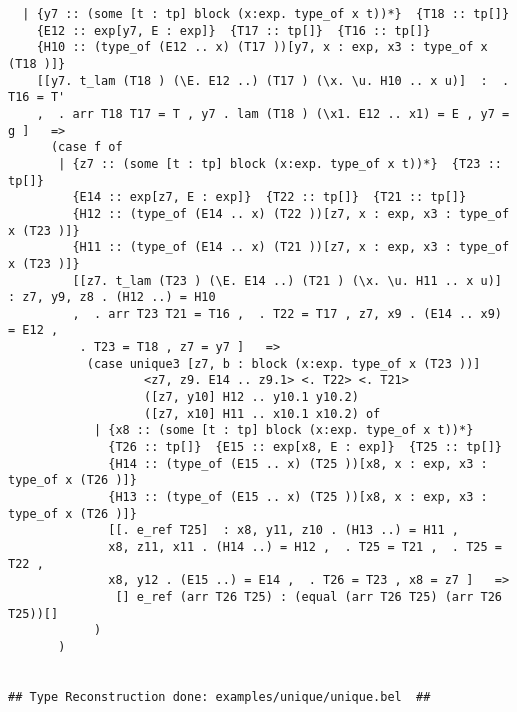 \documentclass[12pt]{article}
\begin{document}
\begin{verbatim}
  | {y7 :: (some [t : tp] block (x:exp. type_of x t))*}  {T18 :: tp[]} 
    {E12 :: exp[y7, E : exp]}  {T17 :: tp[]}  {T16 :: tp[]} 
    {H10 :: (type_of (E12 .. x) (T17 ))[y7, x : exp, x3 : type_of x (T18 )]}
    [[y7. t_lam (T18 ) (\E. E12 ..) (T17 ) (\x. \u. H10 .. x u)]  :  . T16 = T'
    ,  . arr T18 T17 = T , y7 . lam (T18 ) (\x1. E12 .. x1) = E , y7 = g ]   => 
      (case f of 
       | {z7 :: (some [t : tp] block (x:exp. type_of x t))*}  {T23 :: tp[]} 
         {E14 :: exp[z7, E : exp]}  {T22 :: tp[]}  {T21 :: tp[]} 
         {H12 :: (type_of (E14 .. x) (T22 ))[z7, x : exp, x3 : type_of x (T23 )]} 
         {H11 :: (type_of (E14 .. x) (T21 ))[z7, x : exp, x3 : type_of x (T23 )]}
         [[z7. t_lam (T23 ) (\E. E14 ..) (T21 ) (\x. \u. H11 .. x u)]  : z7, y9, z8 . (H12 ..) = H10
         ,  . arr T23 T21 = T16 ,  . T22 = T17 , z7, x9 . (E14 .. x9) = E12 ,
          . T23 = T18 , z7 = y7 ]   => 
           (case unique3 [z7, b : block (x:exp. type_of x (T23 ))]
                   <z7, z9. E14 .. z9.1> <. T22> <. T21>
                   ([z7, y10] H12 .. y10.1 y10.2)
                   ([z7, x10] H11 .. x10.1 x10.2) of 
            | {x8 :: (some [t : tp] block (x:exp. type_of x t))*} 
              {T26 :: tp[]}  {E15 :: exp[x8, E : exp]}  {T25 :: tp[]} 
              {H14 :: (type_of (E15 .. x) (T25 ))[x8, x : exp, x3 : type_of x (T26 )]} 
              {H13 :: (type_of (E15 .. x) (T25 ))[x8, x : exp, x3 : type_of x (T26 )]}
              [[. e_ref T25]  : x8, y11, z10 . (H13 ..) = H11 ,
              x8, z11, x11 . (H14 ..) = H12 ,  . T25 = T21 ,  . T25 = T22 ,
              x8, y12 . (E15 ..) = E14 ,  . T26 = T23 , x8 = z7 ]   => 
               [] e_ref (arr T26 T25) : (equal (arr T26 T25) (arr T26 T25))[]
            )
       )
  

## Type Reconstruction done: examples/unique/unique.bel  ##


\end{verbatim}
\end{document}
